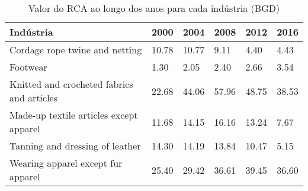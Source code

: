\begin{table}
\centering
\caption{Valor do RCA ao longo dos anos para cada indústria (BGD)}
\begin{tabular}{p{6cm}p{1.5cm}p{1.5cm}p{1.5cm}p{1.5cm}p{1.5cm}}
\toprule
                                 Indústria &  2000 &  2004 &  2008 &  2012 &  2016 \\
\midrule
            Cordage rope twine and netting & 10.78 & 10.77 &  9.11 &  4.40 &  4.43 \\
                                  Footwear &  1.30 &  2.05 &  2.40 &  2.66 &  3.54 \\
Knitted and crocheted fabrics and articles & 22.68 & 44.06 & 57.96 & 48.75 & 38.53 \\
   Made-up textile articles except apparel & 11.68 & 14.15 & 16.16 & 13.24 &  7.67 \\
           Tanning and dressing of leather & 14.30 & 14.19 & 13.84 & 10.47 &  5.15 \\
        Wearing apparel except fur apparel & 25.40 & 29.42 & 36.61 & 39.45 & 36.60 \\
\bottomrule
\end{tabular}
\end{table}
